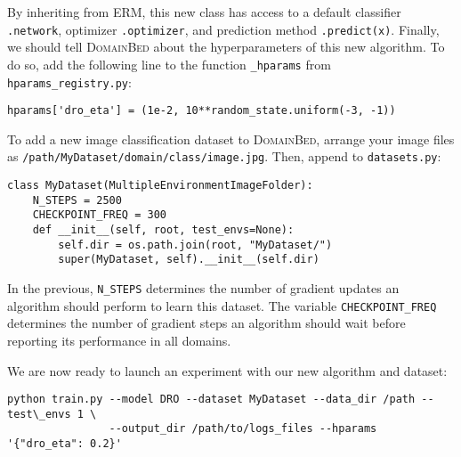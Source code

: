 \documentclass{article}
\newcommand{\domainbed}{\textsc{DomainBed}\xspace}
\begin{document}
\scalebox{0.75}{\usebox{\lsta}}

By inheriting from ERM, this new class has access to a default classifier \texttt{.network}, optimizer \texttt{.optimizer}, and prediction method \texttt{.predict(x)}.
Finally, we should tell \domainbed about the hyperparameters of this new algorithm. To do so, add the following line to the function \texttt{\_hparams} from \texttt{hparams\_registry.py}:


\newsavebox{\lstc}
\begin{lrbox}{\lstc}
\begin{lstlisting}
hparams['dro_eta'] = (1e-2, 10**random_state.uniform(-3, -1))
\end{lstlisting}
\end{lrbox}

\scalebox{0.75}{\usebox{\lstc}}


To add a new image classification dataset to \domainbed, arrange your image files as \texttt{/path/MyDataset/domain/class/image.jpg}.
Then, append to \texttt{datasets.py}:

\newsavebox{\lstb}
\begin{lrbox}{\lstb}
\begin{lstlisting}
class MyDataset(MultipleEnvironmentImageFolder):
    N_STEPS = 2500
    CHECKPOINT_FREQ = 300
    def __init__(self, root, test_envs=None):
        self.dir = os.path.join(root, "MyDataset/")
        super(MyDataset, self).__init__(self.dir)
\end{lstlisting}
\end{lrbox}

\scalebox{0.75}{\usebox{\lstb}}

In the previous, \texttt{N\_STEPS} determines the number of gradient updates an algorithm should perform to learn this dataset.
The variable \texttt{CHECKPOINT\_FREQ} determines the number of gradient steps an algorithm should wait before reporting its performance in all domains.

We are now ready to launch an experiment with our new algorithm and dataset:

\newsavebox{\lstd}
\begin{lrbox}{\lstd}
\begin{lstlisting}
python train.py --model DRO --dataset MyDataset --data_dir /path --test\_envs 1 \
                --output_dir /path/to/logs_files --hparams '{"dro_eta": 0.2}'
\end{lstlisting}
\end{lrbox}
\end{document}
